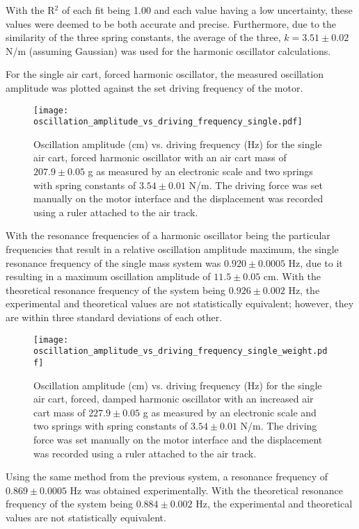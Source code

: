 With the R$^2$ of each fit being 1.00 and each value having a low uncertainty, these values were deemed to be both accurate and precise. Furthermore, due to the similarity of the three spring constants, the average of the three, $k = 3.51 \pm 0.02$ N/m (assuming Gaussian) was used for the harmonic oscillator calculations.

\newpage
For the single air cart, forced harmonic oscillator, the measured oscillation amplitude was plotted against the set driving frequency of the motor.

\begin{figure}[H]
    \centering
	\texttt{[image: oscillation\_amplitude\_vs\_driving\_frequency\_single.pdf]}
	\label{fig::resonanceSingle}
	\caption{Oscillation amplitude (cm) vs. driving frequency (Hz) for the single air cart, forced harmonic oscillator with an air cart mass of $207.9 \pm 0.05$ g as measured by an electronic scale and two springs with spring constants of $3.54 \pm 0.01$ N/m. The driving force was set manually on the motor interface and the displacement was recorded using a ruler attached to the air track.}
\end{figure}

With the resonance frequencies of a harmonic oscillator being the particular frequencies that result in a relative oscillation amplitude maximum, the single resonance frequency of the single mass system was $0.920 \pm 0.0005$ Hz, due to it resulting in a maximum oscillation amplitude of $11.5 \pm 0.05$ cm. With the theoretical resonance frequency of the system being $0.926 \pm 0.002$ Hz, the experimental and theoretical values are not statistically equivalent; however, they are within three standard deviations of each other.

\begin{figure}[H]
    \centering
	\texttt{[image: oscillation\_amplitude\_vs\_driving\_frequency\_single\_weight.pdf]}
	\label{fig::resonanceSingle}
	\caption{Oscillation amplitude (cm) vs. driving frequency (Hz) for the single air cart, forced, damped harmonic oscillator with an increased air cart mass of $227.9 \pm 0.05$ g as measured by an electronic scale and two springs with spring constants of $3.54 \pm 0.01$ N/m. The driving force was set manually on the motor interface and the displacement was recorded using a ruler attached to the air track.}
\end{figure}

Using the same method from the previous system, a resonance frequency of $0.869 \pm 0.0005$ Hz was obtained experimentally. With the theoretical resonance frequency of the system being $0.884 \pm 0.002$ Hz, the experimental and theoretical values are not statistically equivalent.

